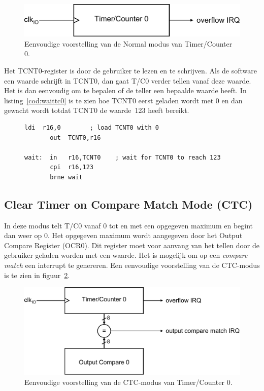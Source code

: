\begin{figure}[!ht]
\centering
\includegraphics[scale=\figscale]{images/timsimpletc0}
\caption{Eenvoudige voorstelling van de Normal modus van Timer/Counter 0.}
\label{fig:timsimpletc0}
\end{figure}


Het TCNT0-register is door de gebruiker te lezen en te schrijven. Als de
software een waarde schrijft in TCNT0, dan gaat T/C0 verder tellen vanaf
deze waarde. Het is dan eenvoudig om te bepalen of de teller een bepaalde
waarde heeft. In listing~\ref{cod:waittc0} is te zien hoe TCNT0 eerst
geladen wordt met 0 en dan gewacht wordt totdat TCNT0 de waarde~123 heeft
bereikt.

\begin{figure}[!ht]
\begin{lstlisting}[language=AVRassembler,caption=Lezen van de tellerwaarde van T/C0.,label=cod:waittc0]
       ldi  r16,0        ; load TCNT0 with 0
       out  TCNT0,r16

wait:  in   r16,TCNT0    ; wait for TCNT0 to reach 123
       cpi  r16,123
       brne wait
\end{lstlisting}
\end{figure}

\subsection{Clear Timer on Compare Match Mode (CTC)}
\label{sec:tc0ctcmode}
In deze modus telt T/C0 vanaf 0 tot en met een opgegeven maximum en begint
dan weer op 0. Het opgegeven maximum wordt aangegeven door het Output Compare
Register (OCR0). Dit register moet voor aanvang van het tellen door de
gebruiker geladen worden met een waarde. Het is mogelijk om op een
\textsl{compare match} een interrupt te genereren. Een eenvoudige
voorstelling van de CTC-modus is te zien in figuur~\ref{fig:timsimplectctc0}.

\begin{figure}[!ht]
\centering
\includegraphics[scale=\figscale]{images/timsimplectctc0}
\caption{Eenvoudige voorstelling van de CTC-modus van Timer/Counter 0.}
\label{fig:timsimplectctc0}
\end{figure}

